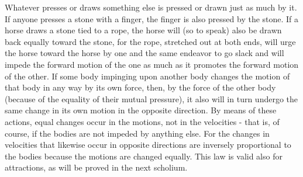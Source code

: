 \begin{enumerate}[label = \textbf{Law \arabic*} \hspace{0.3cm}]
    \hspace{0.3cm} Whatever presses or draws something else is pressed or drawn just as much by it. If anyone presses a stone with a finger, the finger is also pressed by the stone. If a horse draws a stone tied to a rope, the horse will (so to speak) also be drawn back equally toward the stone, for the rope, stretched out at both ends, will urge the horse toward the horse by one and the same endeavor to go slack and will impede the forward motion of the one as much as it promotes the forward motion of the other. If some body impinging upon another body changes the motion of that body in any way by its own force, then, by the force of the other body (because of the equality of their mutual pressure), it also will in turn undergo the same change in its own motion in the opposite direction. By means of these actions, equal changes occur in the motions, not in the velocities - that is, of course, if the bodies are not impeded by anything else. For the changes in velocities that likewise occur in opposite directions are inversely proportional to the bodies because the motions are changed equally. This law is valid also for attractions, as will be proved in the next scholium.
\end{enumerate}